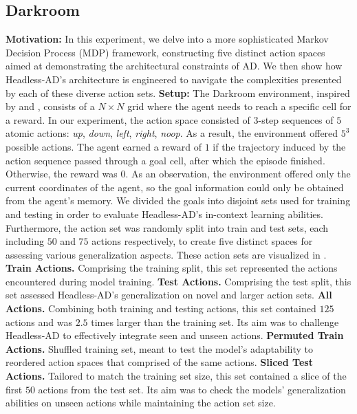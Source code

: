 \documentclass{article}
\theoremstyle{plain}
\theoremstyle{definition}
\theoremstyle{remark}
\begin{document}
\subsection{Darkroom}
\label{sec:exp_gridworld}
\textbf{Motivation:} In this experiment, we delve into a more sophisticated Markov Decision Process (MDP) framework, constructing five distinct action spaces aimed at demonstrating the architectural constraints of AD. We then show how Headless-AD's architecture is engineered to navigate the complexities presented by each of these diverse action sets.
\textbf{Setup:} The Darkroom environment, inspired by \citet{chevalier2018minimalistic} and \citet{jain2020generalization}, consists of a $N \times N$ grid where the agent needs to reach a specific cell for a reward. In our experiment, the action space consisted of $3$-step sequences of $5$ atomic actions: \textit{up}, \textit{down}, \textit{left}, \textit{right}, \textit{noop}. As a result, the environment offered $5^3$ possible actions. The agent earned a reward of $1$ if the trajectory induced by the action sequence passed through a goal cell, after which the episode finished. Otherwise, the reward was $0$. As an observation, the environment offered only the current coordinates of the agent, so the goal information could only be obtained from the agent's memory. We divided the goals into disjoint sets used for training and testing in order to evaluate Headless-AD's in-context learning abilities. Furthermore, the action set was randomly split into train and test sets, each including $50$ and $75$ actions respectively, to create five distinct spaces for assessing various generalization aspects. These action sets are visualized in .
\textbf{Train Actions.} Comprising the training split, this set represented the actions encountered during model training.
\textbf{Test Actions.} Comprising the test split, this set assessed Headless-AD's generalization on novel and larger action sets.
\textbf{All Actions.} Combining both training and testing actions, this set contained $125$ actions and was $2.5$ times larger than the training set. Its aim was to challenge Headless-AD to effectively integrate seen and unseen actions.
\textbf{Permuted Train Actions.} Shuffled training set, meant to test the model's adaptability to reordered action spaces that comprised of the same actions.
\textbf{Sliced Test Actions.} Tailored to match the training set size, this set contained a slice of the first $50$ actions from the test set. Its aim was to check the models' generalization abilities on unseen actions while maintaining the action set size.
\end{document}
